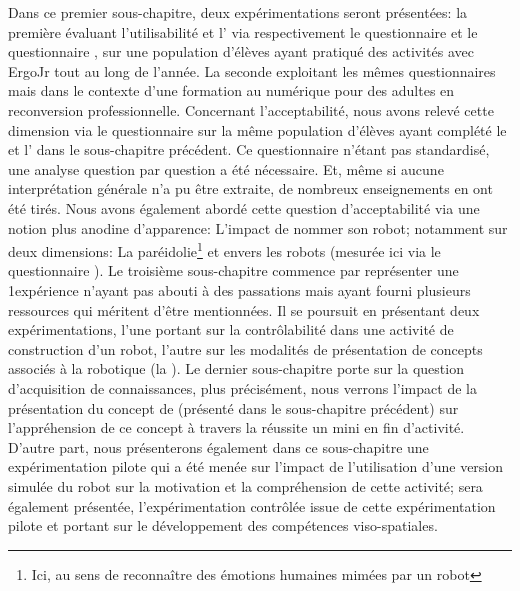                 Dans ce premier sous-chapitre, deux expérimentations seront présentées: la première évaluant l'utilisabilité et l' via respectivement le questionnaire  et le questionnaire , sur une population d'élèves ayant pratiqué des activités avec ErgoJr tout au long de l'année. La seconde exploitant les mêmes questionnaires mais dans le contexte d'une formation au numérique pour des adultes en reconversion professionnelle.
                Concernant l'acceptabilité, nous avons relevé cette dimension via le questionnaire  sur la même population d'élèves ayant complété le  et l' dans le sous-chapitre précédent.
                Ce questionnaire n'étant pas standardisé, une analyse question par question a été nécessaire.
                Et, même si aucune interprétation générale n'a pu être extraite, de nombreux enseignements en ont été tirés.
                Nous avons également abordé cette question d'acceptabilité via une notion plus anodine d'apparence: L'impact de nommer son robot; notamment sur deux dimensions: \Li  La paréidolie\footnote{Ici, au sens de reconnaître des émotions humaines mimées par un robot} et \ii {} envers les robots (mesurée ici via le questionnaire ).
                Le troisième sous-chapitre  commence par représenter une 1\iere expérience n'ayant pas abouti à des passations mais ayant fourni plusieurs ressources qui méritent d'être mentionnées. Il se poursuit en présentant deux expérimentations, l'une portant sur la contrôlabilité dans une activité de construction d'un robot, l'autre sur les modalités de présentation de concepts associés à la robotique (\ie la ).
                Le dernier sous-chapitre porte sur la question d'acquisition de connaissances, plus précisément, nous verrons l'impact de la présentation du concept de  (présenté dans le sous-chapitre précédent) sur  l'appréhension de ce concept à travers la réussite un mini  en fin d'activité. D'autre part, nous présenterons également dans ce sous-chapitre une expérimentation pilote qui a été menée sur l'impact de l'utilisation d'une version simulée du robot sur la motivation et la compréhension de cette activité; sera également présentée,
             l'expérimentation contrôlée  issue de cette expérimentation pilote et portant sur le développement des compétences viso-spatiales.\par%

